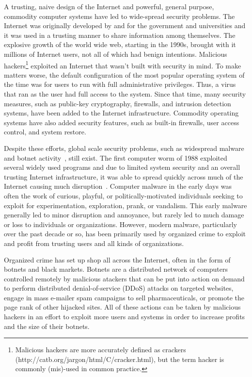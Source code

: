 A trusting, naive design of the Internet and powerful, general purpose, commodity computer systems have led to wide-spread security problems. The Internet was originally developed by and for the government and universities and it was used in a trusting manner to share information among themselves. The explosive growth of the world wide web, starting in the 1990s\cite{Paxson_growthtrends_1994}, brought with it millions of Internet users, not all of which had benign intentions. Malicious hackers\footnote{Malicious hackers are more accurately defined as crackers (http://catb.org/jargon/html/C/cracker.html), but the term hacker is commonly (mis)-used in common practice.} exploited an Internet that wasn't built with security in mind. To make matters worse, the default configuration of the most popular operating system of the time was for users to run with full administrative privileges. Thus, a virus that ran as the user had full access to the system. Since that time, many security measures, such as public-key cryptography, firewalls, and intrusion detection systems, have been added to the Internet infrastructure. Commodity operating systems have also added security features, such as built-in firewalls, user access control, and system restore.

Despite these efforts, global scale security problems, such as widespread malware and botnet activity~\cite{conficker_09, special_ops_09,massive_botnet_09, iBotnet_09, leet09_malware, zombie_computers_nytimes_07}, still exist. The first computer worm of 1988 exploited several widely used programs and due to limited system security and an overall trusting Internet infrastructure, it was able to spread quickly across much of the Internet causing much disruption~\cite{Spafford_1989}. Computer malware in the early days was often the work of curious, playful, or politically-motivated individuals seeking to exploit for experimentation, exploration, prank, or vandalism. This early malware generally led to minor disruption and annoyance, but rarely led to much damage or loss to individuals or organizations. However, modern malware, particularly over the past decade or so, has been primarily used by organized crime to exploit and profit from trusting users and all kinds of organizations\cite{paxson_sellingviagra_2009, verizon_data_breach_report_08, verizon_data_breach_report_09,verizon_data_breach_report_10}.

Organized crime has set up shop all across the Internet, often in the form of botnets and black markets. Botnets are a distributed network of computers controlled remotely by malicious atackers that can be put into action on demand to perform distributed denial-of-service (DDoS) attacks on targeted websites, engage in mass e-mailer spam campaigns to sell pharmaceuticals, or promote the page rank of other hijacked sites. All of these actions can be taken by malicious hackers in an effort to exploit more users and systems in order to increase profits and the size of their botnets.

